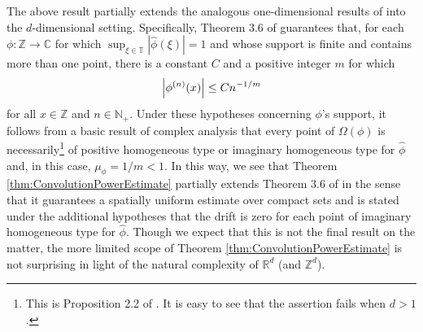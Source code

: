 \documentclass[smallextended]{svjour3}
\theoremstyle{remark}
\begin{document}
\noindent The above result partially extends the analogous one-dimensional results of \cite{randles_convolution_2015} into the $d$-dimensional setting. Specifically, Theorem 3.6 of \cite{randles_convolution_2015} guarantees that, for each $\phi:\mathbb{Z}\to\mathbb{C}$ for which $\sup_{\xi\in\mathbb{T}}|\widehat{\phi}(\xi)|=1$ and whose support is finite and contains more than one point, there is a constant $C$ and a positive integer $m$ for which
\begin{equation*}
    \abs{\phi^{(n)}(x)}\leq Cn^{-1/m}
\end{equation*}
for all $x\in\mathbb{Z}$ and $n\in\mathbb{N}_+$. Under these hypotheses concerning $\phi$'s support, it follows from a basic result of complex analysis that every point of $\Omega(\phi)$ is necessarily\footnote{This is Proposition 2.2 of \cite{randles_convolution_2015}. It is easy to see that the assertion fails when $d>1$.} of positive homogeneous type or imaginary homogeneous type for $\widehat{\phi}$ and, in this case, $\mu_\phi=1/m<1$. In this way, we see that Theorem \ref{thm:ConvolutionPowerEstimate} partially extends Theorem 3.6 of \cite{randles_convolution_2015} in the sense that it guarantees a spatially uniform estimate over compact sets and is stated under the additional hypotheses that the drift is zero for each point of imaginary homogeneous type for $\widehat{\phi}$. Though we expect that this is not the final result on the matter, the more limited scope of Theorem \ref{thm:ConvolutionPowerEstimate} is not surprising in light of the natural complexity of $\mathbb{R}^d$ (and $\mathbb{Z}^d$).\\
\end{document}
